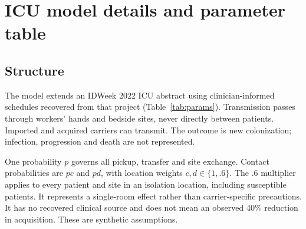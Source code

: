 \documentclass[11pt]{article}
\begin{document}
\section{ICU model details and parameter table}\label{sec:s-model}
\subsection{Structure}
The model extends an IDWeek 2022 ICU abstract \citep{baek2022} using
clinician-informed schedules recovered from that project (Table~\ref{tab:params}).
Transmission passes through workers' hands and bedside sites, never directly
between patients. Imported and acquired carriers can transmit. The outcome is
new colonization; infection, progression and death are not represented.

One probability $p$ governs all pickup, transfer and site exchange. Contact
probabilities are $pc$ and $pd$, with location weights $c,d\in\{1,.6\}$.
The .6 multiplier applies to every patient and site in an isolation location,
including susceptible patients. It represents a single-room effect rather than
carrier-specific precautions. It has no recovered clinical source and does not
mean an observed 40\% reduction in acquisition. These are synthetic assumptions.
\end{document}
